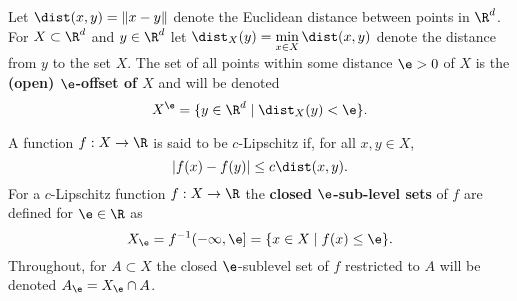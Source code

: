 
Let $\dist(x,y) = \| x - y\|$ denote the Euclidean distance between points in $\R^d$.
For $X\subset\R^d$ and $y\in\R^d$ let $\dist_X(y) = \displaystyle\min_{x\in X}\dist(x, y)$ denote the distance from $y$ to the set $X$.
The set of all points within some distance $\e > 0$ of $X$ is the \textbf{(open) $\e$-offset of $X$} and will be denoted
\[ X^\e = \{ y\in\R^d\mid \dist_X(y) < \e\}. \]

A function $f : X\to\R$ is said to be $c$-Lipschitz if, for all $x,y\in X$,
\[ | f(x) - f(y) | \leq c\dist(x, y).\]
For a $c$-Lipschitz function $f : X\to\R$ the \textbf{closed $\e$-sub-level sets} of $f$ are defined for $\e\in\R$ as
\[ X_\e = f^{-1}(-\infty,\e] = \{x\in X\mid f(x) \leq \e\}.\]
Throughout, for $A\subset X$ the closed $\e$-sublevel set of $f$ restricted to $A$ will be denoted $A_\e = X_\e \cap A$.
